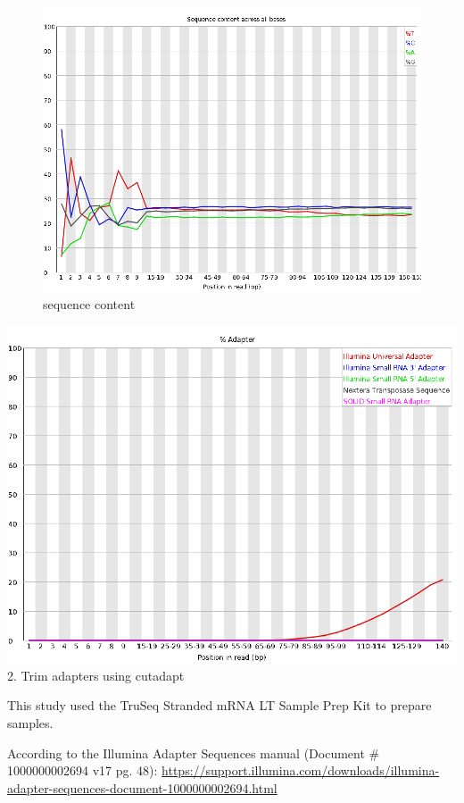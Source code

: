 \documentclass[
]{article}
\begin{document}
\begin{figure}
\centering
\includegraphics{./EarlyOnset_SRR21523117_pass_1_fastqc_basecontent.png}
\caption{sequence content}
\end{figure}

\includegraphics{./EarlyOnset_SRR21523117_pass_1_fastqc_adaptercontent.png}
2. Trim adapters using cutadapt

This study used the TruSeq Stranded mRNA LT Sample Prep Kit to prepare
samples.

According to the Illumina Adapter Sequences manual (Document \#
1000000002694 v17 pg. 48):
\url{https://support.illumina.com/downloads/illumina-adapter-sequences-document-1000000002694.html}
\end{document}
